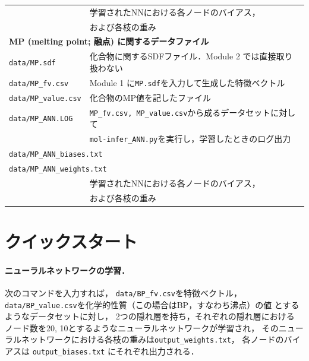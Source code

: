 \documentclass[11pt, titlepage, dvipdfmx, twoside]{jarticle}
\begin{document}
\begin{table}[t!]
\begin{tabular}{lcll}
  &&\multicolumn{2}{l}{学習されたNNにおける各ノードのバイアス，}\\
  &&\multicolumn{2}{l}{および各枝の重み}\\
  \hline
  \multicolumn{4}{l}{\bf MP (melting point; 融点) に関するデータファイル~\cite{pubchem}}\\
  \multicolumn{2}{l}{\tt data/MP.sdf} & \multicolumn{2}{l}{化合物に関するSDFファイル．Module 2 では直接取り扱わない}\\
  \multicolumn{2}{l}{\tt data/MP\_fv.csv} & \multicolumn{2}{l}{Module 1 に{\tt MP.sdf}を入力して生成した特徴ベクトル}\\
  \multicolumn{2}{l}{\tt data/MP\_value.csv} & \multicolumn{2}{l}{化合物のMP値を記したファイル}\\
  \multicolumn{2}{l}{\tt data/MP\_ANN.LOG} & \multicolumn{2}{l}{{\tt MP\_fv.csv, MP\_value.csv}から成るデータセットに対して}\\
  &&\multicolumn{2}{l}{{\tt mol-infer\_ANN.py}を実行し，学習したときのログ出力}\\
  \multicolumn{4}{l}{\tt data/MP\_ANN\_biases.txt} \\
  \multicolumn{4}{l}{\tt data/MP\_ANN\_weights.txt} \\
  &&\multicolumn{2}{l}{学習されたNNにおける各ノードのバイアス，}\\
  &&\multicolumn{2}{l}{および各枝の重み}\\
  \hline
  \end{tabular}

\end{table}


\clearpage
\section{クイックスタート}
\label{sec:quick}

\paragraph{ニューラルネットワークの学習．}

次のコマンドを入力すれば，
\verb|data/BP_fv.csv|を特徴ベクトル，
\verb|data/BP_value.csv|を化学的性質（この場合はBP，すなわち沸点）の値
とするようなデータセットに対し，
2つの隠れ層を持ち，それぞれの隠れ層における
ノード数を20, 10とするようなニューラルネットワークが学習され，
そのニューラルネットワークにおける各枝の重みは\verb|output_weights.txt|，
各ノードのバイアスは
\verb|output_biases.txt|
にそれぞれ出力される．
\end{document}

